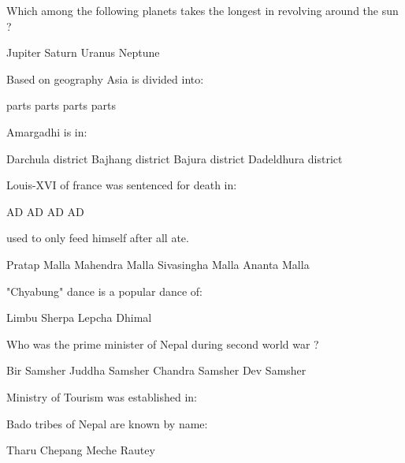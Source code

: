 \begin{questions}
\question Which among the following planets takes the longest in revolving around the sun ?
  \begin{choices}
  \choice Jupiter
  \choice Saturn
  \choice Uranus
  \CorrectChoice Neptune
  \end{choices}

\question Based on geography Asia is divided into:
  \begin{choices}
   parts
   parts
   parts
   parts
  \end{choices}

\question Amargadhi is in:
  \begin{choices}
  \choice Darchula district
  \choice Bajhang district
  \choice Bajura district
  \CorrectChoice Dadeldhura district
  \end{choices}

\question Louis-XVI of france was sentenced for death in:
  \begin{choices}
   AD
   AD
   AD
   AD
  \end{choices}

\question \fillin[][] used to only feed himself after all ate.
  \begin{choices}
  \choice Pratap Malla
  \CorrectChoice Mahendra Malla
  \choice Sivasingha Malla
  \choice Ananta Malla
  \end{choices}

\question "Chyabung" dance is a popular dance of:
  \begin{choices}
  \CorrectChoice Limbu
  \choice Sherpa
  \choice Lepcha
  \choice Dhimal
  \end{choices}

\question Who was the prime minister of Nepal during second world war ?
  \begin{choices}
  \choice Bir Samsher
  \choice Juddha Samsher
  \CorrectChoice Chandra Samsher
  \choice Dev Samsher
  \end{choices}

\question Ministry of Tourism was established in:
  \begin{choices}
  \end{choices}

\question Bado tribes of Nepal are known by name:
  \begin{choices}
  \choice Tharu
  \choice Chepang
  \CorrectChoice Meche
  \choice Rautey
  \end{choices}


\end{questions}
